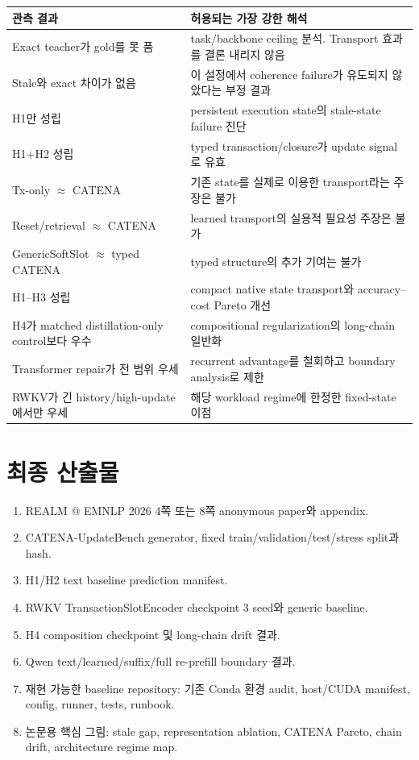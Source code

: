 \documentclass[10.5pt,a4paper]{article}
\begin{document}
\begin{longtable}{@{}L{54mm}p{105mm}@{}}
\toprule
관측 결과 & 허용되는 가장 강한 해석 \\
\midrule
\endhead
Exact teacher가 gold를 못 품 & task/backbone ceiling 분석. Transport 효과를 결론 내리지 않음 \\
Stale와 exact 차이가 없음 & 이 설정에서 coherence failure가 유도되지 않았다는 부정 결과 \\
H1만 성립 & persistent execution state의 stale-state failure 진단 \\
H1+H2 성립 & typed transaction/closure가 update signal로 유효 \\
Tx-only $\approx$ CATENA & 기존 state를 실제로 이용한 transport라는 주장은 불가 \\
Reset/retrieval $\approx$ CATENA & learned transport의 실용적 필요성 주장은 불가 \\
GenericSoftSlot $\approx$ typed CATENA & typed structure의 추가 기여는 불가 \\
H1--H3 성립 & compact native state transport와 accuracy--cost Pareto 개선 \\
H4가 matched distillation-only control보다 우수 & compositional regularization의 long-chain 일반화 \\
Transformer repair가 전 범위 우세 & recurrent advantage를 철회하고 boundary analysis로 제한 \\
RWKV가 긴 history/high-update에서만 우세 & 해당 workload regime에 한정한 fixed-state 이점 \\
\bottomrule
\end{longtable}

\section{최종 산출물}

\begin{enumerate}
\item REALM @ EMNLP 2026 4쪽 또는 8쪽 anonymous paper와 appendix.
\item CATENA-UpdateBench generator, fixed train/validation/test/stress split과 hash.
\item H1/H2 text baseline prediction manifest.
\item RWKV TransactionSlotEncoder checkpoint 3 seed와 generic baseline.
\item H4 composition checkpoint 및 long-chain drift 결과.
\item Qwen text/learned/suffix/full re-prefill boundary 결과.
\item 재현 가능한 baseline repository: 기존 Conda 환경 audit, host/CUDA manifest, config, runner, tests, runbook.
\item 논문용 핵심 그림: stale gap, representation ablation, CATENA Pareto, chain drift, architecture regime map.
\end{enumerate}
\end{document}
